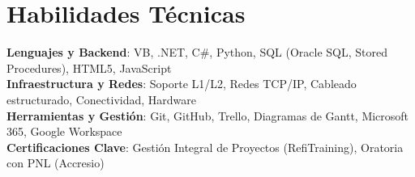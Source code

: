 \documentclass[letterpaper,10.5pt]{article}
\begin{document}
\section{Habilidades Técnicas}
 \begin{itemize}[leftmargin=0.15in, label={}]
    \small{\item{
     \textbf{Lenguajes y Backend}{: VB, .NET, C\#, Python, SQL (Oracle SQL, Stored Procedures), HTML5, JavaScript} \\
     \textbf{Infraestructura y Redes}{: Soporte L1/L2, Redes TCP/IP, Cableado estructurado, Conectividad, Hardware} \\
     \textbf{Herramientas y Gestión}{: Git, GitHub, Trello, Diagramas de Gantt, Microsoft 365, Google Workspace} \\
     \textbf{Certificaciones Clave}{: Gestión Integral de Proyectos (RefiTraining), Oratoria con PNL (Accresio)}
    }}
 \end{itemize}
\end{document}

